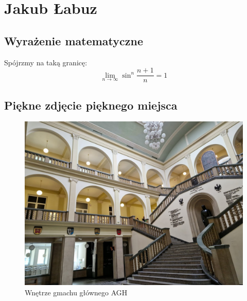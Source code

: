 \newpage

\section{Jakub Łabuz}

\subsection{Wyrażenie matematyczne}
Spójrzmy na taką granicę:
\[ \lim_{n\to\infty} \sin^n \frac{n+1}{n} = 1\]

\subsection{Piękne zdjęcie pięknego miejsca}
\begin{figure}[h]
    \centering
    \includegraphics[scale=0.3]{pictures/obrJŁ/1}
    \caption{Wnętrze gmachu głównego AGH}
    \label{fig:agh}
\end{figure}


\newpage



